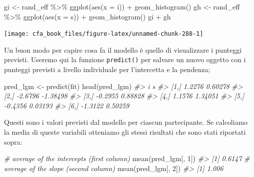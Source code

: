 \documentclass[
  11pt,
]{krantz}
\makeatletter
\newenvironment{Shaded}{\begin{snugshade}}{\end{snugshade}}
\newcommand{\AttributeTok}[1]{\textcolor[rgb]{0.61,0.61,0.61}{#1}}
\newcommand{\CommentTok}[1]{\textcolor[rgb]{0.37,0.37,0.37}{\textit{#1}}}
\newcommand{\DecValTok}[1]{\textcolor[rgb]{0.06,0.06,0.06}{#1}}
\newcommand{\FunctionTok}[1]{\textcolor[rgb]{0,0,0}{#1}}
\newcommand{\NormalTok}[1]{#1}
\newcommand{\OtherTok}[1]{\textcolor[rgb]{0.37,0.37,0.37}{#1}}
\newcommand{\SpecialCharTok}[1]{\textcolor[rgb]{0,0,0}{#1}}
\newenvironment{kframe}{%
\medskip{}
\setlength{\fboxsep}{.8em}
 \def\at@end@of@kframe{}%
 \ifinner\ifhmode%
  \def\at@end@of@kframe{\end{minipage}}%
  \begin{minipage}{\columnwidth}%
 \fi\fi%
 \def\FrameCommand##1{\hskip\@totalleftmargin \hskip-\fboxsep
 \colorbox{shadecolor}{##1}\hskip-\fboxsep
     \hskip-\linewidth \hskip-\@totalleftmargin \hskip\columnwidth}%
 \MakeFramed {\advance\hsize-\width
   \@totalleftmargin\z@ \linewidth\hsize
   \@setminipage}}%
 {\par\unskip\endMakeFramed%
 \at@end@of@kframe}
\renewenvironment{Shaded}{\begin{kframe}}{\end{kframe}}
\theoremstyle{definition}
\theoremstyle{definition}
\theoremstyle{definition}
\theoremstyle{definition}
\theoremstyle{remark}
\makeatother
\begin{document}
\begin{Shaded}
\begin{Highlighting}[]
\NormalTok{gi }\OtherTok{\textless{}{-}}\NormalTok{ rand\_eff }\SpecialCharTok{\%\textgreater{}\%}
  \FunctionTok{ggplot}\NormalTok{(}\FunctionTok{aes}\NormalTok{(}\AttributeTok{x =}\NormalTok{ i)) }\SpecialCharTok{+}
  \FunctionTok{geom\_histogram}\NormalTok{()}
\NormalTok{gh }\OtherTok{\textless{}{-}}\NormalTok{ rand\_eff }\SpecialCharTok{\%\textgreater{}\%}
  \FunctionTok{ggplot}\NormalTok{(}\FunctionTok{aes}\NormalTok{(}\AttributeTok{x =}\NormalTok{ s)) }\SpecialCharTok{+}
  \FunctionTok{geom\_histogram}\NormalTok{()}
\NormalTok{gi }\SpecialCharTok{+}\NormalTok{ gh}
\end{Highlighting}
\end{Shaded}

\begin{center}\texttt{[image: cfa\_book\_files/figure-latex/unnamed-chunk-288-1]} \end{center}

Un buon modo per capire cosa fa il modello è quello di visualizzare i punteggi previsti. Useremo qui la funzione \texttt{predict()} per salvare un nuovo oggetto con i punteggi previsti a livello individuale per l'intercetta e la pendenza;

\begin{Shaded}
\begin{Highlighting}[]
\NormalTok{pred\_lgm }\OtherTok{\textless{}{-}} \FunctionTok{predict}\NormalTok{(fit)}
\FunctionTok{head}\NormalTok{(pred\_lgm)}
\CommentTok{\#\textgreater{}            i        s}
\CommentTok{\#\textgreater{} [1,]  1.2276  0.60278}
\CommentTok{\#\textgreater{} [2,] {-}2.6796 {-}1.38498}
\CommentTok{\#\textgreater{} [3,] {-}0.2955  0.88828}
\CommentTok{\#\textgreater{} [4,]  1.1576  1.34051}
\CommentTok{\#\textgreater{} [5,] {-}0.4356  0.03193}
\CommentTok{\#\textgreater{} [6,] {-}1.3122  0.50259}
\end{Highlighting}
\end{Shaded}

Questi sono i valori previsti dal modello per ciascun partecipante. Se calcoliamo la media di queste variabili otteniamo gli stessi risultati che sono stati riportati sopra:

\begin{Shaded}
\begin{Highlighting}[]
\CommentTok{\# average of the intercepts (first column)}
\FunctionTok{mean}\NormalTok{(pred\_lgm[, }\DecValTok{1}\NormalTok{])}
\CommentTok{\#\textgreater{} [1] 0.6147}
\CommentTok{\# average of the slope (second column)}
\FunctionTok{mean}\NormalTok{(pred\_lgm[, }\DecValTok{2}\NormalTok{])}
\CommentTok{\#\textgreater{} [1] 1.006}
\end{Highlighting}
\end{Shaded}
\end{document}

